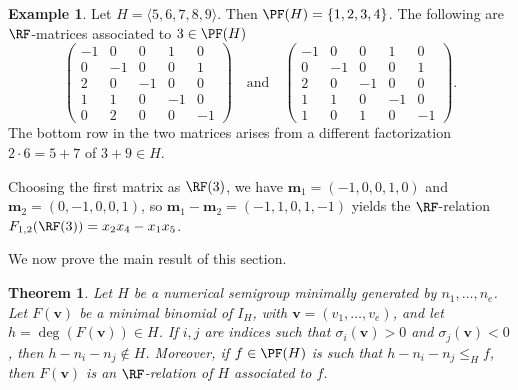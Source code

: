 \documentclass[11pt,twoside]{amsart}
\def\bv{{\mathbf v}}
\def\bm{{\mathbf m}}
\newtheorem{thm}[Theorem]{Theorem}
\theoremstyle{definition}
\newtheorem{ex}[Theorem]{Example}
\numberwithin{equation}{section}
\begin{document}
\begin{ex}

Let $H=\langle5,6,7,8,9\rangle$.
Then $\PF(H)=\{1, 2,3,4\}$. 
The following are $\RF$-matrices associated to  $3 \in \PF(H)$
\[
\begin{pmatrix}
-1 & 0 & 0 & 1 & 0 \\
0 & -1 & 0 & 0 & 1 \\
2 & 0 & -1 & 0 & 0 \\
1 & 1 & 0 & - 1 & 0 \\
0 & 2 & 0 & 0 & -1\end{pmatrix}
\quad\text{and}\quad
\begin{pmatrix}
-1 & 0 & 0 & 1 & 0 \\
0 & -1 & 0 & 0 & 1 \\
2 & 0 & -1 & 0 & 0 \\
1 & 1 & 0 & - 1 & 0 \\
1 & 0 & 1 & 0 & -1
\end{pmatrix}.
\]
The bottom row in the two matrices arises from a different factorization $2\cdot 6 = 5+7$ of $3+9 \in H$.

Choosing the first matrix as $\RF(3)$, we have  $\bm_1=(-1,0,0,1,0)$ and $\bm_2=(0,-1,0,0,1)$, so $\bm_1-\bm_2=(-1,1,0,1,-1)$ yields the $\RF$-relation $F_{1,2}(\RF(3))=x_2x_4-x_1x_5$. 
\end{ex}


We now prove the main result of this section.

\begin{thm}\label{ThmRFRelations}
Let $H$ be a numerical semigroup minimally generated by $n_1, \ldots,n_e$.
Let $F(\bv) $ be a minimal binomial of $I_H$,
with $\bv= (v_1, \ldots, v_e)$,
and let $h = \deg(F(\bv))\in H$.
If $i,j$ are  indices such that $\sigma_i(\bv) > 0$ and $\sigma_j(\bv) < 0$, then $h-n_i-n_j \not \in H$. 
Moreover, if $f \in \PF(H)$ is such that $h-n_i-n_j \le_H f$, then $F(\bv)$ is an $\RF$-relation of $H$ associated to $f$.
\end{thm}
\end{document}
